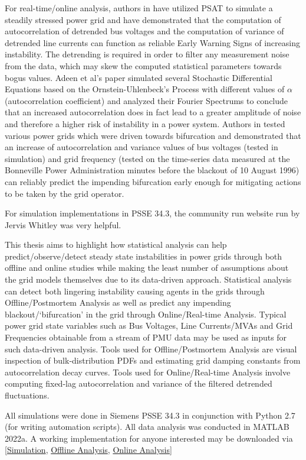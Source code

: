 For real-time/online analysis, authors in \cite{ghanvati01} have utilized PSAT \cite{psatMilano} to simulate a steadily stressed power grid and have demonstrated that the computation of autocorrelation of detrended bus voltages and the computation  of variance of detrended line currents can function as reliable Early Warning Signs of increasing instability. The detrending is required in order to filter any measurement noise from the data, which may skew the computed statistical parameters towards bogus values. Adeen et al's paper \cite{adeen01} simulated several Stochastic Differential Equations based on the Ornstein-Uhlenbeck's Process with different values of $\alpha$ (autocorrelation coefficient) and analyzed their Fourier Spectrums to conclude that an increased autocorrelation does in fact lead to a greater amplitude of noise and therefore a higher risk of instability in a power system. Authors in \cite{sanchez01} tested various power grids which were driven towards bifurcation and demonstrated that an increase of autocorrelation and variance values of bus voltages (tested in simulation) and grid frequency (tested on the time-series data measured at the Bonneville Power Administration minutes before the blackout of 10 August 1996) can reliably predict the impending bifurcation early enough for mitigating actions to be taken by the grid operator.

For simulation implementations in PSSE 34.3, the community run website run by Jervis Whitley \cite{psspyWebsite} was very helpful.

This thesis aims to highlight how statistical analysis can help predict/observe/detect steady state instabilities in power grids through both offline and online studies while making the least number of assumptions about the grid models themselves due to its data-driven approach. Statistical analysis can detect both lingering instability causing agents in the grids through Offline/Postmortem Analysis as well as predict any impending blackout/`bifurcation' in the grid through Online/Real-time Analysis. Typical power grid state variables such as Bus Voltages, Line Currents/MVAs and Grid Frequencies obtainable from a stream of PMU data may be used as inputs for such data-driven analysis. Tools used for Offline/Postmortem Analysis are visual inspection of bulk-distribution PDFs and estimating grid damping constants from autocorrelation decay curves. Tools used for Online/Real-time Analysis involve computing fixed-lag autocorrelation and variance of the filtered detrended fluctuations.

All simulations were done in Siemens PSSE 34.3 in conjunction with Python 2.7 (for writing automation scripts). All data analysis was conducted in MATLAB 2022a. A working implementation for anyone interested may be downloaded via [\href{https://t.ly/HwAT}{Simulation}, \href{https://t.ly/e1f9}{Offline Analysis}, \href{https://t.ly/u_Mp}{Online Analysis}]